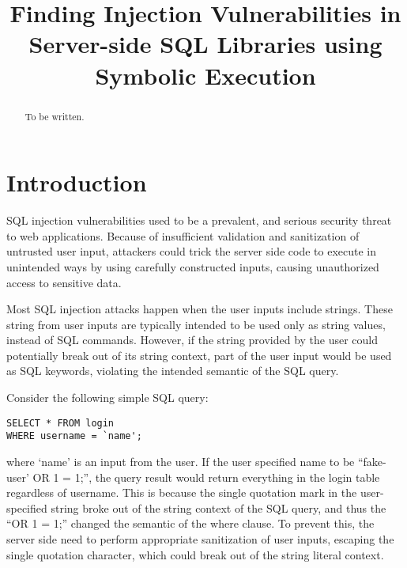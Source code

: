 \documentclass[conference]{IEEEtran}
\begin{document}
\title{Finding Injection Vulnerabilities in Server-side SQL Libraries using Symbolic Execution}

\author{
}

\maketitle

\begin{abstract}

To be written.

\end{abstract}

\IEEEpeerreviewmaketitle

\section{Introduction}
\label{introduction}

SQL injection vulnerabilities used to be a prevalent, and serious security threat to web applications. Because of insufficient validation and sanitization of untrusted user input, attackers could trick the server side code to execute in unintended ways by using carefully constructed inputs, causing unauthorized access to sensitive data.

Most SQL injection attacks happen when the user inputs include strings. These string from user inputs are typically intended to be used only as string values, instead of SQL commands. However, if the string provided by the user could potentially break out of its string context, part of the user input would be used as SQL keywords, violating the intended semantic of the SQL query. 

Consider the following simple SQL query:
\begin{lstlisting}[breaklines=true]
SELECT * FROM login 
WHERE username = `name';
\end{lstlisting}
where `name' is an input from the user.
If the user specified name to be ``fake-user' OR 1 = 1;'', the query result would return everything in the login table regardless of username. This is because the single quotation mark in the user-specified string broke out of the string context of the SQL query, and thus the ``OR 1 = 1;'' changed the semantic of the where clause.
To prevent this, the server side need to perform appropriate sanitization of user inputs, escaping the single quotation character, which could break out of the string literal context.
\end{document}
